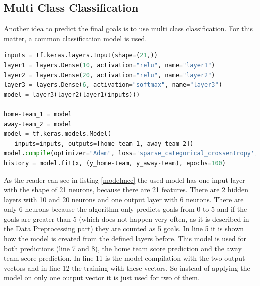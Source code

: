 \begin{table}
\centering
{}
\caption{ Quality Model for Away Team and Home Team}
\label{table:qualitymodelregression}
\end{table}

\subsection{Multi Class Classification}
Another idea to predict the final goals is to use multi class classification. For this matter, a common classification model is used.

\begin{lstlisting}[language=Python, caption=Python code for multi class classification, label=modelmcc]
inputs = tf.keras.layers.Input(shape=(21,))
layer1 = layers.Dense(10, activation="relu", name="layer1")
layer2 = layers.Dense(20, activation="relu", name="layer2")
layer3 = layers.Dense(6, activation="softmax", name="layer3")
model = layer3(layer2(layer1(inputs)))

home-team_1 = model
away-team_2 = model
model = tf.keras.models.Model(
   inputs=inputs, outputs=[home-team_1, away-team_2])
model.compile(optimizer="Adam", loss='sparse_categorical_crossentropy', metrics=[ "acc"])
history = model.fit(x, (y_home-team, y_away-team), epochs=100)
\end{lstlisting}

As the reader can see in listing \ref{modelmcc} the used model has one input layer with the shape of 21 neurons, because there are 21 features. There are 2 hidden layers with 10 and 20 neurons and one output layer with 6 neurons. There are only 6 neurons because the algorithm only predicts goals from 0 to 5 and if the goals are greater than 5 (which does not happen very often, as it is described in the Data Preprocessing part) they are counted as 5 goals. In line 5 it is shown how the model is created from the defined layers before. This model is used for both predictions (line 7 and 8), the home team score prediction and the away team score prediction. In line 11 is the model compilation with the two output vectors and in line 12 the training with these vectors. So instead of applying the model on only one output vector it is just used for two of them. 

